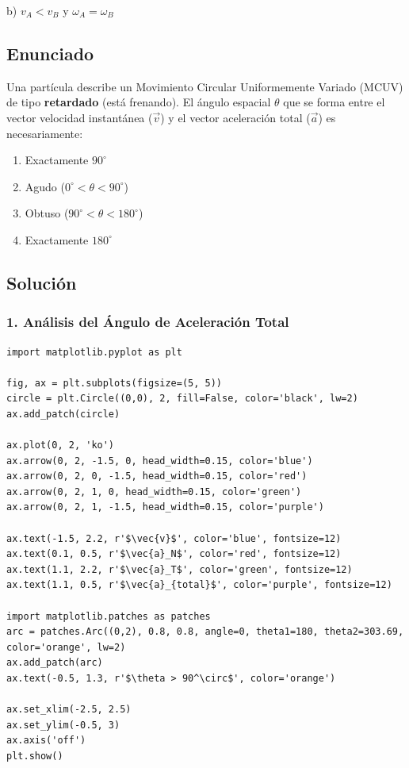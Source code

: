 \documentclass[12pt, a4paper]{article}
\begin{document}
\begin{tcolorbox}[colback=green!5!white, colframe=green!50!black, title=Respuesta Final]
\centering \Large b) $v_A < v_B$ y $\omega_A = \omega_B$
\end{tcolorbox}

\newpage

\subsection*{Enunciado}
Una partícula describe un Movimiento Circular Uniformemente Variado (MCUV) de tipo \textbf{retardado} (está frenando). El ángulo espacial $\theta$ que se forma entre el vector velocidad instantánea ($\vec{v}$) y el vector aceleración total ($\vec{a}$) es necesariamente:
\begin{enumerate}[label=\alph*)]
    \item Exactamente $90^\circ$
    \item Agudo ($0^\circ < \theta < 90^\circ$)
    \item Obtuso ($90^\circ < \theta < 180^\circ$)
    \item Exactamente $180^\circ$
\end{enumerate}

\subsection*{Solución}

\subsubsection*{1. Análisis del Ángulo de Aceleración Total}

\begin{verbatim}
import matplotlib.pyplot as plt

fig, ax = plt.subplots(figsize=(5, 5))
circle = plt.Circle((0,0), 2, fill=False, color='black', lw=2)
ax.add_patch(circle)

ax.plot(0, 2, 'ko')
ax.arrow(0, 2, -1.5, 0, head_width=0.15, color='blue')
ax.arrow(0, 2, 0, -1.5, head_width=0.15, color='red')
ax.arrow(0, 2, 1, 0, head_width=0.15, color='green')
ax.arrow(0, 2, 1, -1.5, head_width=0.15, color='purple')

ax.text(-1.5, 2.2, r'$\vec{v}$', color='blue', fontsize=12)
ax.text(0.1, 0.5, r'$\vec{a}_N$', color='red', fontsize=12)
ax.text(1.1, 2.2, r'$\vec{a}_T$', color='green', fontsize=12)
ax.text(1.1, 0.5, r'$\vec{a}_{total}$', color='purple', fontsize=12)

import matplotlib.patches as patches
arc = patches.Arc((0,2), 0.8, 0.8, angle=0, theta1=180, theta2=303.69, color='orange', lw=2)
ax.add_patch(arc)
ax.text(-0.5, 1.3, r'$\theta > 90^\circ$', color='orange')

ax.set_xlim(-2.5, 2.5)
ax.set_ylim(-0.5, 3)
ax.axis('off')
plt.show()
\end{verbatim}
\end{document}
